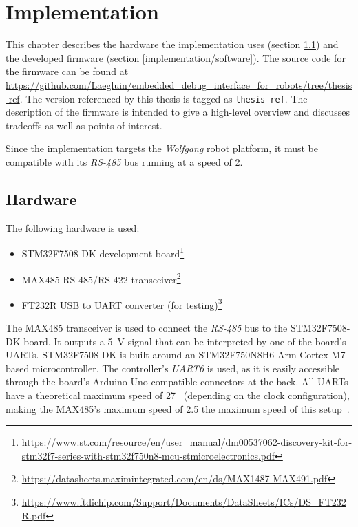 \chapter{Implementation}
\label{implementation}

This chapter describes the hardware the implementation uses (section \ref{implementation/hardware})
and the developed firmware (section \ref{implementation/software}). The source code for the firmware
can be found at \url{https://github.com/Laegluin/embedded_debug_interface_for_robots/tree/thesis-ref}.
The version referenced by this thesis is tagged as \lstinline{thesis-ref}. The description of the
firmware is intended to give a high-level overview and discusses tradeoffs as well as points of
interest.

Since the implementation targets the \textit{Wolfgang} robot platform, it must be compatible with
its \textit{RS-485} bus running at a speed of \SI{2}{}.

\section{Hardware}
\label{implementation/hardware}

The following hardware is used:

\begin{itemize}
    \item STM32F7508-DK development board\footnote{\url{https://www.st.com/resource/en/user_manual/dm00537062-discovery-kit-for-stm32f7-series-with-stm32f750n8-mcu-stmicroelectronics.pdf}}
    \item MAX485 RS-485/RS-422 transceiver\footnote{\url{https://datasheets.maximintegrated.com/en/ds/MAX1487-MAX491.pdf}}
    \item FT232R USB to UART converter (for testing)\footnote{\url{https://www.ftdichip.com/Support/Documents/DataSheets/ICs/DS_FT232R.pdf}}
\end{itemize}

The MAX485 transceiver is used to connect the \textit{RS-485} bus to the STM32F7508-DK board. It
outputs a \SI{5}{\volt} signal that can be interpreted by one of the board's UARTs. STM32F7508-DK
is built around an STM32F750N8H6 Arm Cortex-M7 based microcontroller. The controller's \textit{UART6}
is used, as it is easily accessible through the board's Arduino Uno compatible connectors at the
back. All UARTs have a theoretical maximum speed of \SI{27}{}~\cite{mcu-ref-manual} (depending
on the clock configuration), making the MAX485's maximum speed of \SI{2.5}{} the maximum speed
of this setup~\cite{max-485-manual}\cite{board-user-manual}.

